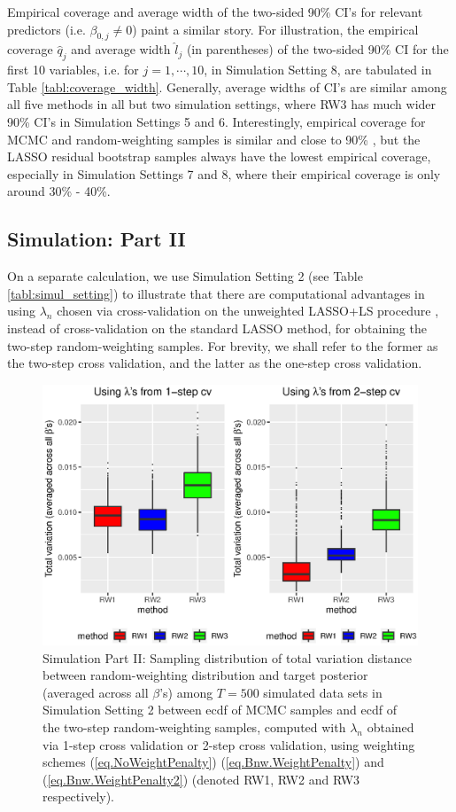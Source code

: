 \documentclass[ejs,authoryear,linksfromyear]{imsart}
\numberwithin{equation}{section}
\theoremstyle{plain}
\begin{document}
Empirical coverage and average width of the two-sided 90\% CI's for relevant predictors (i.e. $\beta_{0,j} \neq 0$)  paint a similar story. For illustration, the empirical coverage $\hat{q}_j$ and average width $\hat{l}_j$ (in parentheses) of the two-sided 90\% CI for the first 10 variables, i.e. for $j= 1, \cdots, 10$, in Simulation Setting 8, are tabulated in Table \ref{tabl:coverage_width}. Generally, average widths of CI's are similar among all five methods in all but two simulation settings, where RW3 has much wider 90\% CI's in Simulation Settings 5 and 6. Interestingly, empirical coverage for MCMC and random-weighting samples is similar and close to 90\% , but the LASSO residual bootstrap samples always have the lowest empirical coverage, especially in Simulation Settings 7 and 8, where their empirical coverage is only around 30\% - 40\%.   


\subsection{Simulation: Part II}

On a separate calculation, we use Simulation Setting 2 (see Table \ref{tabl:simul_setting}) to illustrate that there are computational advantages in using $\lambda_n$ chosen via cross-validation on the unweighted LASSO+LS procedure \citep{Liu&Yu}, instead of cross-validation on the standard LASSO method, for obtaining the two-step random-weighting samples. For brevity, we shall refer to the former as the two-step cross validation, and the latter as the one-step cross validation. 

\begin{figure}[!]
	\centering
	\includegraphics[scale=0.6]{simul2_TV}
	\caption{Simulation Part II: Sampling distribution of total variation distance between random-weighting distribution and 
	target posterior (averaged across all $\beta$'s) among $T = 500$ simulated data sets in Simulation Setting 2 between ecdf of MCMC samples and ecdf of the two-step random-weighting samples, computed with $\lambda_n$ obtained via 1-step cross validation or 2-step cross validation, using weighting schemes (\ref{eq.NoWeightPenalty}) (\ref{eq.Bnw.WeightPenalty}) and (\ref{eq.Bnw.WeightPenalty2}) (denoted RW1, RW2 and RW3 respectively).}
	\label{fig:simul2_TV}
\end{figure}  
\end{document}
